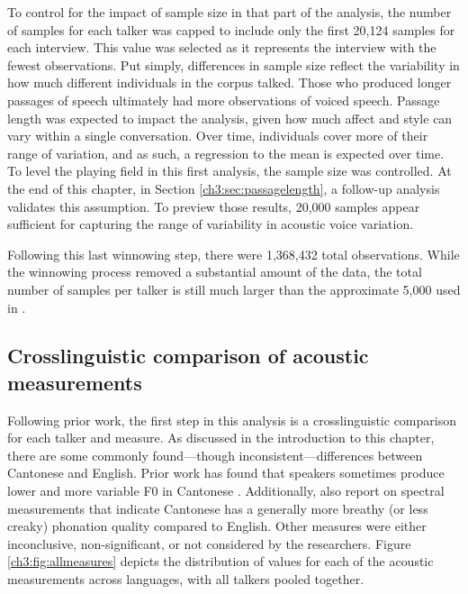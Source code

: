 To control for the impact of sample size in that part of the analysis, the number of samples for each talker was capped to include only the first 20,124 samples for each interview. This value was selected as it represents the interview with the fewest observations. Put simply, differences in sample size reflect the variability in how much different individuals in the corpus talked. Those who produced longer passages of speech ultimately had more observations of voiced speech. Passage length was expected to impact the analysis, given how much affect and style can vary within a single conversation. Over time, individuals cover more of their range of variation, and as such, a regression to the mean is expected over time. To level the playing field in this first analysis, the sample size was controlled. At the end of this chapter, in Section \ref{ch3:sec:passagelength}, a follow-up analysis validates this assumption. To preview those results, 20,000 samples appear sufficient for capturing the range of variability in acoustic voice variation.

Following this last winnowing step, there were 1,368,432 total observations. While the winnowing process removed a substantial amount of the data, the total number of samples per talker is still much larger than the approximate 5,000 used in \citet{lee_2019_acoustic}.

\subsection{Crosslinguistic comparison of acoustic measurements}\label{ch3:sec:comparison}

Following prior work, the first step in this analysis is a crosslinguistic comparison for each talker and measure. As discussed in the introduction to this chapter, there are some commonly found---though inconsistent---differences between Cantonese and English. Prior work has found that speakers sometimes produce lower and more variable F0 in Cantonese \citep{altenberg_2006_f0,ng_2012_ltas,ng_2010_voice}. Additionally, \citet{ng_2012_ltas} also report on spectral measurements that indicate Cantonese has a generally more breathy (or less creaky) phonation quality compared to English. Other measures were either inconclusive, non-significant, or not considered by the researchers. Figure \ref{ch3:fig:allmeasures} depicts the distribution of values for each of the acoustic measurements across languages, with all talkers pooled together. 

